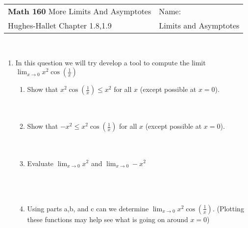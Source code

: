 \documentclass[12pt]{report}
\begin{document}
\begin{tabular*}{\textwidth}{@{\extracolsep{\fill}}ll}
\textbf{Math 160} More Limits And Asymptotes & \;\;Name: \hrulefill \\
 Hughes-Hallet Chapter 1.8,1.9& Limits and Asymptotes\hspace{1in}  \\
\hline\hline
\end{tabular*} \\





\begin{enumerate}
\item In this question we will try develop a tool to compute the limit $\displaystyle{\lim_{x\to 0}x^2\cos\left(\frac{1}{x}\right)}$
\begin{enumerate}[label=\alph*.]
    \item Show that $x^2\cos\left(\frac{1}{x}\right)\leq x^2$ for all $x$ (except possible at $x=0$).\\\\\\
    \item Show that $-x^2\leq x^2\cos\left(\frac{1}{x}\right)$ for all $x$ (except possible at $x=0$).\\\\\\
    \item Evaluate $\displaystyle{\lim_{x\to 0}x^2}$ and $\displaystyle{\lim_{x\to 0}-x^2}$\\\\\\\\
    \item Using parts a,b, and c can we determine $\displaystyle{\lim_{x\to 0}x^2\cos\left(\frac{1}{x}\right)}$. (Plotting these functions may help see what is going on around $x=0$)\\\\\\\\
\end{enumerate}


\end{enumerate}
\end{document}

